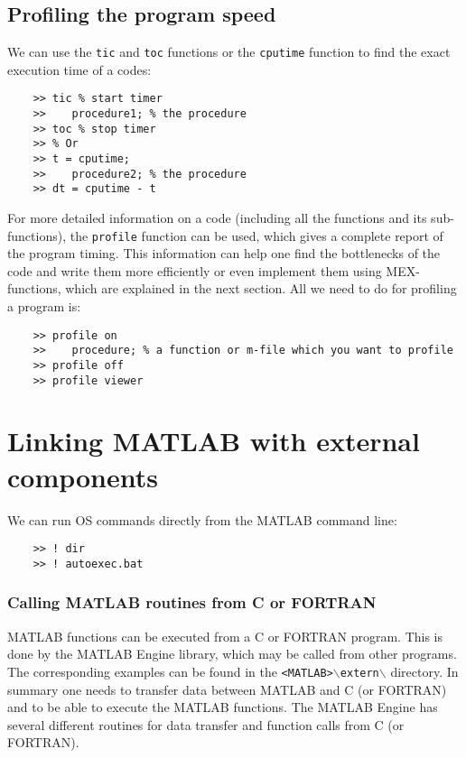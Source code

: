 \documentclass[10pt,a4paper]{article}
\newcounter{example}[section]
\begin{document}
\subsection{Profiling the program speed}
We can use the \texttt{tic} and \texttt{toc} functions or the \texttt{cputime} function to find the exact execution time of a codes:
\begin{lstlisting}
	>> tic % start timer
	>> 	  procedure1; % the procedure
	>> toc % stop timer
	>> % Or
	>> t = cputime;
	>> 	  procedure2; % the procedure
	>> dt = cputime - t
\end{lstlisting}
For more detailed information on a code (including all the functions and its sub-functions), the \texttt{profile} function can be used, which gives a complete report of the program timing. This information can help one find the bottlenecks of the code and write them more efficiently or even implement them using MEX-functions, which are explained in the next section. All we need to do for profiling a program is:
\begin{lstlisting}
	>> profile on
	>> 	  procedure; % a function or m-file which you want to profile
	>> profile off
	>> profile viewer
\end{lstlisting}
\section{Linking MATLAB with external components}
We can run OS commands directly from the MATLAB command line:
\begin{lstlisting}
	>> ! dir
	>> ! autoexec.bat
\end{lstlisting}
\subsubsection{Calling MATLAB routines from C or FORTRAN}
MATLAB functions can be executed from a C or FORTRAN program. This is done by the MATLAB Engine library, which may be called from other programs. The corresponding examples can be found in the \texttt{<MATLAB>$\backslash$extern$\backslash$} directory. In summary one needs to transfer data between MATLAB and C (or FORTRAN) and to be able to execute the MATLAB functions. The MATLAB Engine has several different routines for data transfer and function calls from C (or FORTRAN).
\end{document}
